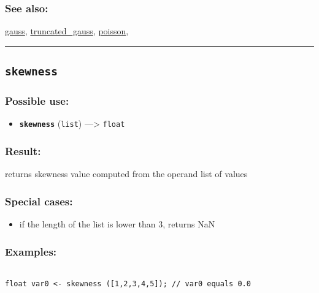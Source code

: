 \documentclass[]{book}
\providecommand{\tightlist}{%
  \setlength{\itemsep}{0pt}\setlength{\parskip}{0pt}}
\theoremstyle{definition}
\theoremstyle{definition}
\theoremstyle{definition}
\theoremstyle{remark}
\begin{document}
\subsubsection{See also:}\label{see-also-187}

\href{operators-d-to-h.html\#gauss}{gauss},
\href{operators-s-to-z.html\#truncated_gauss}{truncated\_gauss},
\href{operators-n-to-r.html\#poisson}{poisson},

\begin{center}\rule{0.5\linewidth}{\linethickness}\end{center}

\subsection{\texorpdfstring{\texttt{skewness}}{skewness}}\label{skewness}

\subsubsection{Possible use:}\label{possible-use-482}

\begin{itemize}
\tightlist
\item
  \textbf{\texttt{skewness}} (\texttt{list}) ---\textgreater{}
  \texttt{float}
\end{itemize}

\subsubsection{Result:}\label{result-466}

returns skewness value computed from the operand list of values

\subsubsection{Special cases:}\label{special-cases-123}

\begin{itemize}
\tightlist
\item
  if the length of the list is lower than 3, returns NaN
\end{itemize}

\subsubsection{Examples:}\label{examples-337}

\begin{verbatim}
 
float var0 <- skewness ([1,2,3,4,5]); // var0 equals 0.0
\end{verbatim}
\end{document}
